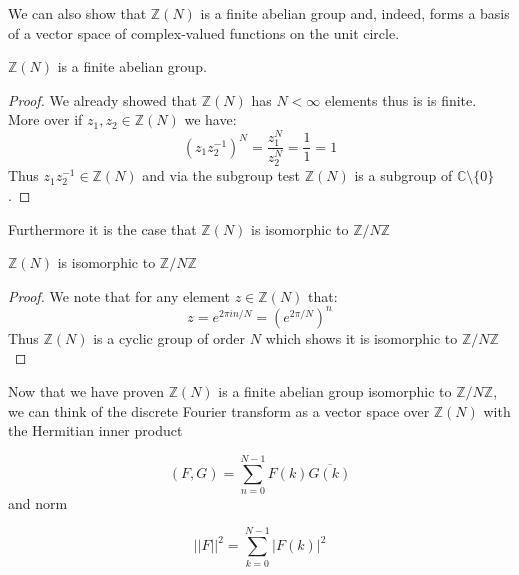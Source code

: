 \documentclass[../article.tex]{subfiles}
\begin{document}
We can also show that $\mathbb{Z}(N)$ is a finite abelian group and, indeed, forms a basis of a vector space of complex-valued functions on the unit circle.

\begin{theorem}
$\mathbb{Z}(N)$ is a finite abelian group.
\end{theorem}

\begin{proof}
    We already showed that $\mathbb{Z}(N)$ has $N < \infty$
    elements thus is is finite. More over if $z_1,z_2 \in
    \mathbb{Z}(N)$ we have:
    \[
        (z_1z_2^{-1})^N = \frac{z_1^N}{z_2^N} = \frac{1}{1} = 1
    \]
    Thus $z_1z_2^{-1} \in \mathbb{Z}(N)$ and via the subgroup
    test $\mathbb{Z}(N)$ is a subgroup of $\mathbb{C} 
    \setminus\{0\}$.
\end{proof}

Furthermore it is the case that $\mathbb{Z}(N)$ is isomorphic
to $\mathbb{Z}/N\mathbb{Z}$

\begin{theorem}
$\mathbb{Z}(N)$ is isomorphic to $\mathbb{Z}/N\mathbb{Z}$
\end{theorem}

\begin{proof}
    We note that for any element $z \in \mathbb{Z}(N)$
    that:
    \[
        z = e^{2\pi in/N} = (e^{2\pi/N})^n
    \]
    Thus $\mathbb{Z}(N)$ is a cyclic group of order $N$ 
    which shows it is isomorphic to $\mathbb{Z}/N\mathbb{Z}$
\end{proof}
Now that we have proven $\mathbb{Z}(N)$ is a finite abelian group  isomorphic to $\mathbb{Z} /N\mathbb{Z}$, we can think of the discrete Fourier transform as a vector space over $\mathbb{Z}(N)$ with the Hermitian inner product


\[
  (F,G) = \sum_{n=0}^{N-1} F(k) \overline{G(k)}
\]
and norm

\[
  ||F||^2 = \sum_{k=0}^{N-1} |F(k)|^2
\]
\end{document}
